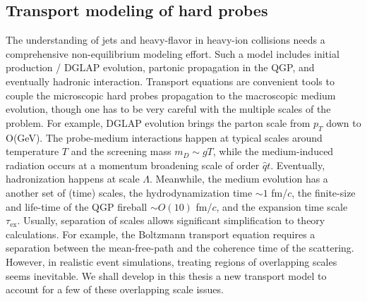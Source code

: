 \subsection{Transport modeling of hard probes}
The understanding of jets and heavy-flavor in heavy-ion collisions needs a comprehensive non-equilibrium modeling effort.
Such a model includes initial production / DGLAP evolution, partonic propagation in the QGP, and eventually hadronic interaction.
Transport equations are convenient tools to couple the microscopic hard probes propagation to the macroscopic medium evolution, though one has to be very careful with the multiple scales of the problem.
For example, DGLAP evolution brings the parton scale from $p_T$ down to O(GeV).
The probe-medium interactions happen at typical scales around temperature $T$ and the screening mass $m_D \sim gT$, while the medium-induced radiation occurs at a momentum broadening scale of order $\hat{q} t$.
Eventually, hadronization happens at scale $\Lambda$.
Meanwhile, the medium evolution has a another set of (time) scales, the hydrodynamization time $\sim 1$ fm/$c$, the finite-size and life-time of the QGP fireball $\sim O(10)$  fm/$c$, and the expansion time scale $\tau_{\textrm{ex}}$.
Usually, separation of scales allows significant simplification to theory calculations.
For example, the Boltzmann transport equation requires a separation between the mean-free-path and the coherence time of the scattering.
However, in realistic event simulations, treating regions of overlapping scales seems inevitable.
We shall develop in this thesis a new transport model to account for a few of these overlapping scale issues.


